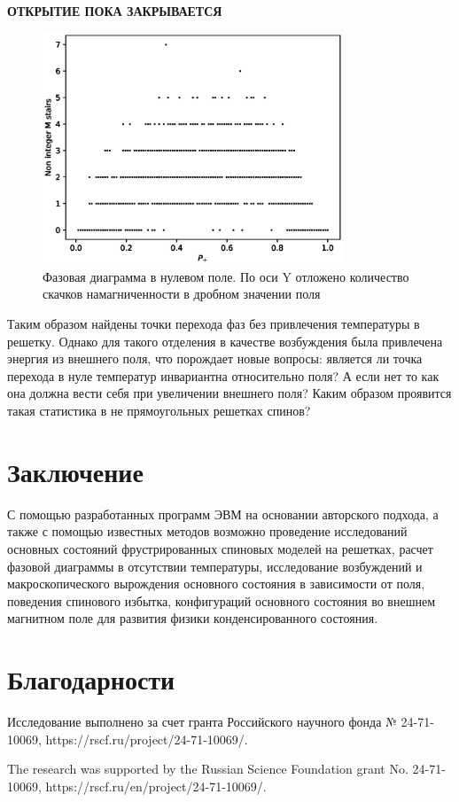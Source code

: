 \documentclass[utf8, babel, sor, jor, amsmath, amssymb, reprint]{elsarticle} %
\begin{document}
\textbf{ОТКРЫТИЕ ПОКА ЗАКРЫВАЕТСЯ}

\begin{figure}[H]
	\centering
	\includegraphics[width=0.8\textwidth]{images/Fractional_stairs.eps}
	\caption{Фазовая диаграмма в нулевом поле. По оси Y отложено количество скачков намагниченности в дробном значении поля}
	\label{fig:fractional_stairs}
\end{figure}

Таким образом найдены точки перехода фаз без привлечения температуры в решетку. Однако для такого отделения в качестве возбуждения была привлечена энергия из внешнего поля, что порождает новые вопросы: является ли точка перехода в нуле температур инвариантна относительно поля? А если нет то как она должна вести себя при увеличении внешнего поля? Каким образом проявится такая статистика в не прямоугольных решетках спинов?

\section{Заключение}

С помощью разработанных программ ЭВМ на основании авторского подхода, а также с помощью известных методов возможно проведение исследований основных состояний фрустрированных спиновых моделей на решетках, расчет фазовой диаграммы в отсутствии температуры, исследование возбуждений и макроскопического вырождения основного состояния в зависимости от поля, поведения спинового избытка, конфигураций основного состояния во внешнем магнитном поле для развития физики конденсированного состояния.


\section{Благодарности}

Исследование выполнено за счет гранта Российского научного фонда № 24-71-10069, https://rscf.ru/project/24-71-10069/.

The research was supported by the Russian Science Foundation grant No. 24-71-10069, https://rscf.ru/en/project/24-71-10069/.


\end{document}
